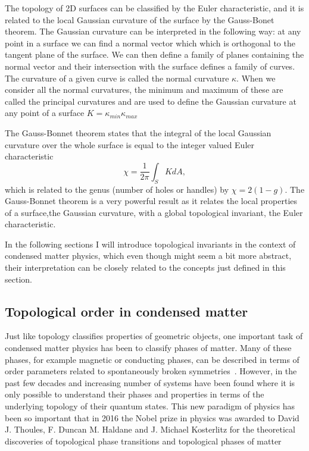 The topology of 2D surfaces can be classified by the Euler characteristic, and it is related to the local Gaussian curvature of the surface by the Gauss-Bonet theorem. The Gaussian curvature can be interpreted in the following way: at any point in a surface we can find a normal vector which which is orthogonal to the tangent plane of the surface. We can then define a family of planes containing the normal vector and their intersection with the surface defines a family of curves. The curvature of a given curve is called the normal curvature $\kappa$. When we consider all the normal curvatures, the minimum and maximum of these are called the principal curvatures and are used to define the Gaussian curvature at any point of a surface $K=\kappa_{min}\kappa_{max}$~\cite{differential_topology_and_geometry} 

The Gauss-Bonnet theorem states that the integral of the local Gaussian curvature over the whole surface is equal to the integer valued Euler characteristic
%
\begin{equation}
	\chi = \frac{1}{2\pi}\int_S K dA,
	\label{eq:euler_characteristic}
\end{equation}
%
which is related to the genus (number of holes or handles) by $\chi=2(1-g)$. The Gauss-Bonnet theorem is a very powerful result as it relates the local properties of a surface,the Gaussian curvature, with a global topological invariant, the Euler characteristic. 

In the following sections I will introduce topological invariants in the context of condensed matter physics, which even though might seem a bit more abstract, their interpretation can be closely related to the concepts just defined in this section.

\subsection{Topological order in condensed matter}

Just like topology classifies properties of geometric objects, one important task of condensed matter physics has been to classify phases of matter. Many of these phases, for example magnetic or conducting phases, can be described in terms of order parameters related to spontaneously broken symmetries~\cite{landau_theory_1936}. However, in the past few decades and increasing number of systems have been found where it is only possible to understand their phases and properties in terms of the underlying topology of their quantum states. This new paradigm of physics has been so important that in 2016 the Nobel prize in physics was awarded to David J. Thoules, F. Duncan M. Haldane and J. Michael Kosterlitz for the theoretical discoveries of topological phase transitions and topological phases of matter 

